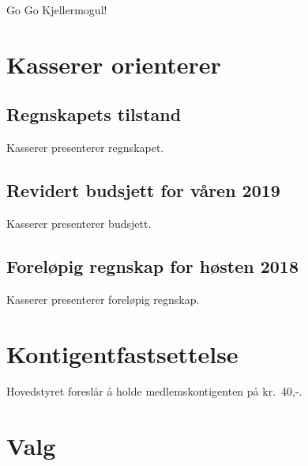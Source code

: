 \documentclass[10pt,norsk,a4paper]{article}
\begin{document}
Go Go Kjellermogul!



\section{Kasserer orienterer}
\subsection{Regnskapets tilstand}
Kasserer presenterer regnskapet.

\subsection{Revidert budsjett for våren 2019}
Kasserer presenterer budsjett.

\subsection{Foreløpig regnskap for høsten 2018}
Kasserer presenterer foreløpig regnskap.

\section{Kontigentfastsettelse}
Hovedstyret foreslår å holde medlemskontigenten på kr.~40,-.

\newpage

\section{Valg}
\end{document}
